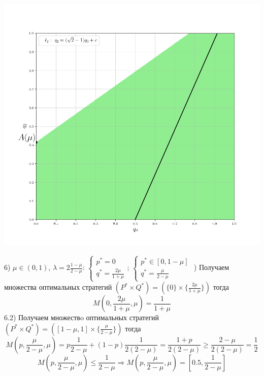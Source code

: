 \documentclass[letterpaper,12pt, reqno]{article}
\begin{document}
\begin{flushleft}
\begin{center}
\includegraphics[scale=0.5]{graf_3_6}
\end{center}
6) $\mu \in (0, 1)$, $\lambda = 2\frac{1-\mu}{2-\mu}$: 
$\begin{cases}p^{*}=0 \\ q^{*}=\frac{2\mu}{1+\mu} \end{cases}$;
$\begin{cases}p^{*} \in [0,1-\mu] \\ q^{*}=\frac{\mu}{2-\mu} \end{cases}$
\hfill {}) Получаем множества оптимальных стратегий 
$(P^{*} \times Q^{*}) =(\{0\} \times \{\frac{2\mu}{1+\mu}\})$ тогда
$$M(0, \frac{2\mu}{1+\mu}, \mu)=\frac{1}{1+\mu}$$
6.2) Получаем множествo оптимальных стратегий 
$(P^{*}\times Q^{*}) =([1-\mu,1] \times \{\frac{\mu}{2-\mu}\})$ тогда
$$M(p,\frac{\mu}{2-\mu},\mu)=p\frac{1}{2-\mu}+(1-p)\frac{1}{2(2-\mu)}=\frac{1+p}{2(2-\mu)} \geq \frac{2-\mu}{2(2-\mu)}=\frac{1}{2}$$
$$M(p,\frac{\mu}{2-\mu},\mu) \leq \frac{1}{2-\mu} \Rightarrow M(p,\frac{\mu}{2-\mu},\mu) = [0.5, \frac{1}{2-\mu}]$$



\end{flushleft}
\end{document}
